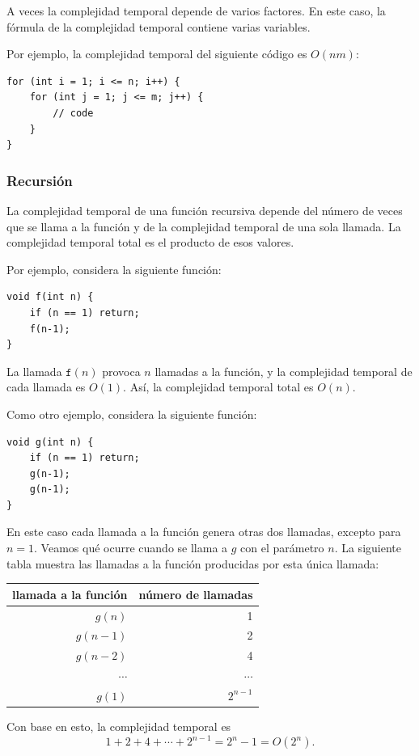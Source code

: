 A veces la complejidad temporal depende de
varios factores.
En este caso, la fórmula de la complejidad temporal
contiene varias variables.

Por ejemplo, la complejidad temporal del
siguiente código es $O(nm)$:

\begin{lstlisting}
for (int i = 1; i <= n; i++) {
    for (int j = 1; j <= m; j++) {
        // code
    }
}
\end{lstlisting}

\subsubsection*{Recursión}

La complejidad temporal de una función recursiva
depende del número de veces que se llama a la función
y de la complejidad temporal de una sola llamada.
La complejidad temporal total es el producto de
esos valores.

Por ejemplo, considera la siguiente función:
\begin{lstlisting}
void f(int n) {
    if (n == 1) return;
    f(n-1);
}
\end{lstlisting}
La llamada $\texttt{f}(n)$ provoca $n$ llamadas a la función,
y la complejidad temporal de cada llamada es $O(1)$.
Así, la complejidad temporal total es $O(n)$.

Como otro ejemplo, considera la siguiente función:
\begin{lstlisting}
void g(int n) {
    if (n == 1) return;
    g(n-1);
    g(n-1);
}
\end{lstlisting}
En este caso cada llamada a la función genera otras dos
llamadas, excepto para $n=1$.
Veamos qué ocurre cuando se llama a $g$
con el parámetro $n$.
La siguiente tabla muestra las llamadas a la función
producidas por esta única llamada:
\begin{center}
\begin{tabular}{rr}
llamada a la función & número de llamadas \\
\hline
$g(n)$ & 1 \\
$g(n-1)$ & 2 \\
$g(n-2)$ & 4 \\
$\cdots$ & $\cdots$ \\
$g(1)$ & $2^{n-1}$ \\
\end{tabular}
\end{center}
Con base en esto, la complejidad temporal es
\[1+2+4+\cdots+2^{n-1} = 2^n-1 = O(2^n).\]

